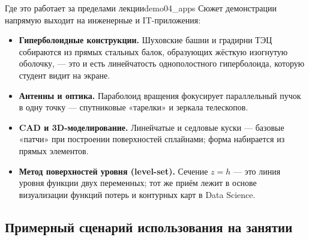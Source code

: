 \begin{remarkIT}{Где это работает за пределами лекции}{demo04_apps}
  Сюжет демонстрации напрямую выходит на инженерные и
  IT-приложения:
  \begin{itemize}
    \item \textbf{Гиперболоидные конструкции.} Шуховские башни и
      градирни ТЭЦ собираются из прямых стальных балок, образующих
      жёсткую изогнутую оболочку, --- это и есть линейчатость
      однополостного гиперболоида, которую студент видит на экране.
    \item \textbf{Антенны и оптика.} Параболоид вращения фокусирует
      параллельный пучок в одну точку --- спутниковые «тарелки» и
      зеркала телескопов.
    \item \textbf{CAD и 3D-моделирование.} Линейчатые и седловые куски
      --- базовые «патчи» при построении поверхностей сплайнами; форма
      набирается из прямых элементов.
    \item \textbf{Метод поверхностей уровня (level-set).} Сечение
      $z = h$ --- это линия уровня функции двух переменных; тот же
      приём лежит в основе визуализации функций потерь и контурных
      карт в Data Science.
  \end{itemize}
\end{remarkIT}

\subsection*{Примерный сценарий использования на занятии}


